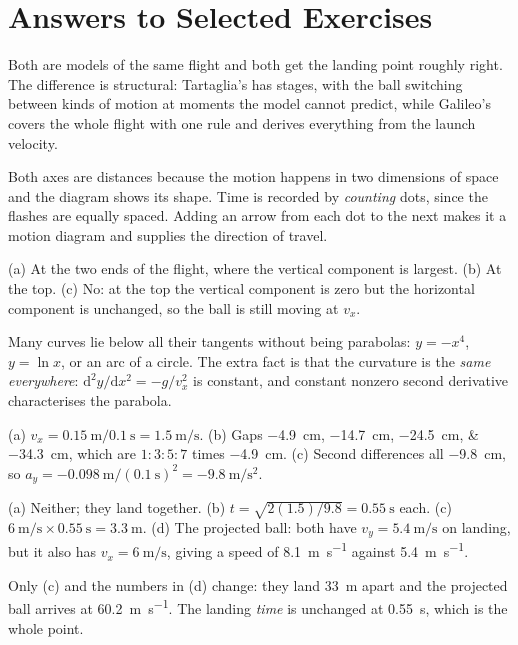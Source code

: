 \documentclass[11pt,twoside,openany]{book}
\newcommand{\dd}{\mathrm{d}}
\begin{document}
\section*{Answers to Selected Exercises}
\begin{description}[leftmargin=2.6em,itemsep=3pt,style=sameline]
  \item[3.2] Both are models of the same flight and both get the landing point roughly right. The difference is structural: Tartaglia's has stages, with the ball switching between kinds of motion at moments the model cannot predict, while Galileo's covers the whole flight with one rule and derives everything from the launch velocity.
  \item[3.3] Both axes are distances because the motion happens in two dimensions of space and the diagram shows its shape. Time is recorded by \emph{counting} dots, since the flashes are equally spaced. Adding an arrow from each dot to the next makes it a motion diagram and supplies the direction of travel.
  \item[3.4] (a) At the two ends of the flight, where the vertical component is largest. (b) At the top. (c) No: at the top the vertical component is zero but the horizontal component is unchanged, so the ball is still moving at $v_x$.
  \item[3.6] Many curves lie below all their tangents without being parabolas: $y = -x^4$, $y = \ln x$, or an arc of a circle. The extra fact is that the curvature is the \emph{same everywhere}: $\dd^2y/\dd x^2 = -g/v_x^2$ is constant, and constant nonzero second derivative characterises the parabola.
  \item[3.7] (a) $v_x = \SI{0.15}{\metre}/\SI{0.1}{\second} = \SI{1.5}{\metre\per\second}$. (b) Gaps \SIlist{-4.9;-14.7;-24.5;-34.3}{\centi\metre}, which are $1:3:5:7$ times \SI{-4.9}{\centi\metre}. (c) Second differences all \SI{-9.8}{\centi\metre}, so $a_y = \SI{-0.098}{\metre}/(\SI{0.1}{\second})^2 = \SI{-9.8}{\metre\per\second\squared}$.
  \item[3.8] (a) Neither; they land together. (b) $t = \sqrt{2(1.5)/9.8} = \SI{0.55}{\second}$ each. (c) $\SI{6}{\metre\per\second}\times\SI{0.55}{\second} = \SI{3.3}{\metre}$. (d) The projected ball: both have $v_y = \SI{5.4}{\metre\per\second}$ on landing, but it also has $v_x = \SI{6}{\metre\per\second}$, giving a speed of \SI{8.1}{\metre\per\second} against \SI{5.4}{\metre\per\second}.
  \item[3.9] Only (c) and the numbers in (d) change: they land \SI{33}{\metre} apart and the projected ball arrives at \SI{60.2}{\metre\per\second}. The landing \emph{time} is unchanged at \SI{0.55}{\second}, which is the whole point.

\end{description}
\end{document}

